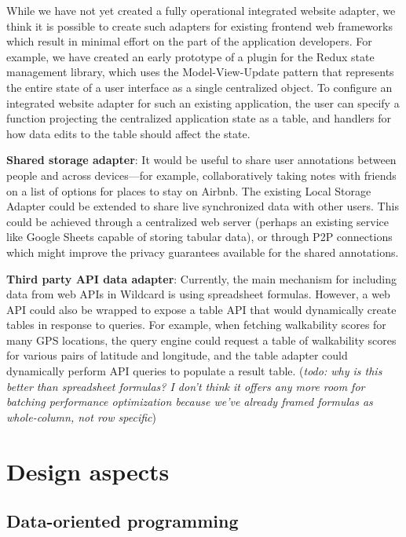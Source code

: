 \documentclass[sigplan,10pt,anonymous,review]{acmart}
\begin{document}
While we have not yet created a fully operational integrated website
adapter, we think it is possible to create such adapters for existing
frontend web frameworks which result in minimal effort on the part of
the application developers. For example, we have created an early
prototype of a plugin for the Redux state management library, which uses
the Model-View-Update pattern that represents the entire state of a user
interface as a single centralized object. To configure an integrated
website adapter for such an existing application, the user can specify a
function projecting the centralized application state as a table, and
handlers for how data edits to the table should affect the state.

\textbf{Shared storage adapter}: It would be useful to share user
annotations between people and across devices---for example,
collaboratively taking notes with friends on a list of options for
places to stay on Airbnb. The existing Local Storage Adapter could be
extended to share live synchronized data with other users. This could be
achieved through a centralized web server (perhaps an existing service
like Google Sheets capable of storing tabular data), or through P2P
connections which might improve the privacy guarantees available for the
shared annotations.

\textbf{Third party API data adapter}: Currently, the main mechanism for
including data from web APIs in Wildcard is using spreadsheet formulas.
However, a web API could also be wrapped to expose a table API that
would dynamically create tables in response to queries. For example,
when fetching walkability scores for many GPS locations, the query
engine could request a table of walkability scores for various pairs of
latitude and longitude, and the table adapter could dynamically perform
API queries to populate a result table. (\emph{todo: why is this better
than spreadsheet formulas? I don't think it offers any more room for
batching performance optimization because we've already framed formulas
as whole-column, not row specific})

\hypertarget{design-aspects}{%
\section{Design aspects}\label{design-aspects}}

\hypertarget{data-oriented-programming}{%
\subsection{Data-oriented programming}\label{data-oriented-programming}}
\end{document}
